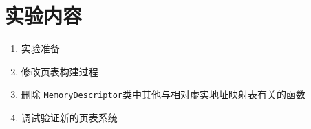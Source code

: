 \section{实验内容}
\begin{enumerate}
    \item 实验准备
    \item 修改页表构建过程
    \item 删除 \texttt{MemoryDescriptor}类中其他与相对虚实地址映射表有关的函数
    \item 调试验证新的页表系统
\end{enumerate}